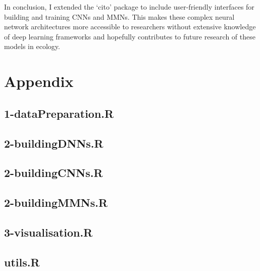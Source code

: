 \documentclass[12pt,twoside]{scrreport}
\newcommand{\pkg}[1]{`#1'}
\begin{document}
In conclusion, I extended the \pkg{cito} package to include user-friendly interfaces for building and training CNNs and MMNs. This makes these complex neural network architectures more accessible to researchers without extensive knowledge of deep learning frameworks and hopefully contributes to future research of these models in ecology.

\newpage
\renewcommand{\bibname}{References}
 

\chapter*{Appendix}
\lstset{style=Rstyle}
\section*{1-dataPreparation.R}

\newpage
\section*{2-buildingDNNs.R}

\newpage
\section*{2-buildingCNNs.R}

\newpage
\section*{2-buildingMMNs.R}

\newpage
\section*{3-visualisation.R}

\newpage
\section*{utils.R}

\newpage
\end{document}
